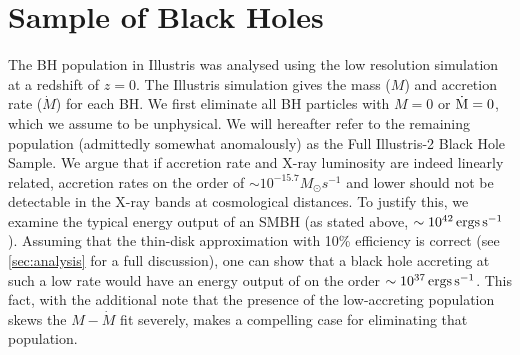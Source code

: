 \section{Sample of Black Holes}

\label{sec:sample}The BH population in Illustris was analysed using 
the low resolution simulation at a redshift of $z=0$. The Illustris 
simulation gives the mass ($M$) and accretion rate ($\dot{M}$) for each BH. We first 
eliminate all BH particles with $M=0$ or $\dot{{\rm M}}=0$, which 
we assume to be unphysical. We will hereafter refer to the remaining 
population (admittedly somewhat anomalously) as the Full Illustris-2 
Black Hole Sample. We argue that if accretion rate and X-ray luminosity 
are indeed linearly related, accretion rates on the order of 
$\sim10^{-15.7}M_{\odot}s^{-1}$ and lower should not be detectable in 
the X-ray bands at cosmological distances. To justify this, we examine 
the typical energy output of an SMBH (as stated above, 
$\sim10^{42}\,{\rm ergs}\,{\rm s^{-1}}$). Assuming that the thin-disk
approximation with 10\% efficiency is correct (see \ref{sec:analysis}
for a full discussion), one can show that a black hole accreting at 
such a low rate would have an energy output of on the order 
$\sim10^{37}\,{\rm ergs}\,{\rm s^{-1}}$. This fact, with the 
additional note that the presence of the low-accreting population 
skews the $M-\dot{M}$ fit severely, makes a compelling case for
eliminating that population.

